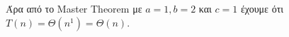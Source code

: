 \documentclass[a4paper,10pt]{article}
\begin{document}
\begin{flushleft}
\begin{enumerate}
        Άρα από το Master Theorem με $a=1, b=2$ και $c=1$ έχουμε ότι $T(n) = \Theta(n^1) = \Theta(n)$.
    \end{enumerate}
\end{flushleft}
\end{document}
